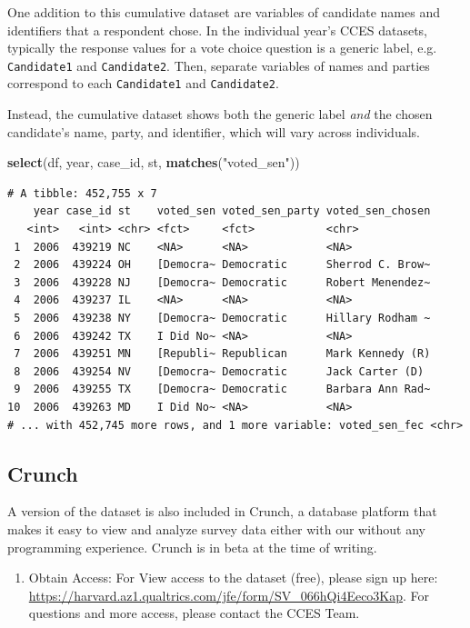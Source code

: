 \documentclass[10pt,article,oneside]{memoir}
\theoremstyle{definition}
\newenvironment{Shaded}{\begin{snugshade}}{\end{snugshade}}
\newcommand{\KeywordTok}[1]{\textcolor[rgb]{0.13,0.29,0.53}{\textbf{#1}}}
\newcommand{\NormalTok}[1]{#1}
\newcommand{\StringTok}[1]{\textcolor[rgb]{0.31,0.60,0.02}{#1}}
\begin{document}
One addition to this cumulative dataset are variables of candidate names
and identifiers that a respondent chose. In the individual year's CCES
datasets, typically the response values for a vote choice question is a
generic label, e.g. \texttt{Candidate1} and \texttt{Candidate2}. Then,
separate variables of names and parties correspond to each
\texttt{Candidate1} and \texttt{Candidate2}.

Instead, the cumulative dataset shows both the generic label \emph{and}
the chosen candidate's name, party, and identifier, which will vary
across individuals.

\begin{Shaded}
\begin{Highlighting}[]
\KeywordTok{select}\NormalTok{(df, year, case_id, st, }\KeywordTok{matches}\NormalTok{(}\StringTok{"voted_sen"}\NormalTok{))}
\end{Highlighting}
\end{Shaded}

\begin{verbatim}
# A tibble: 452,755 x 7
    year case_id st    voted_sen voted_sen_party voted_sen_chosen
   <int>   <int> <chr> <fct>     <fct>           <chr>           
 1  2006  439219 NC    <NA>      <NA>            <NA>            
 2  2006  439224 OH    [Democra~ Democratic      Sherrod C. Brow~
 3  2006  439228 NJ    [Democra~ Democratic      Robert Menendez~
 4  2006  439237 IL    <NA>      <NA>            <NA>            
 5  2006  439238 NY    [Democra~ Democratic      Hillary Rodham ~
 6  2006  439242 TX    I Did No~ <NA>            <NA>            
 7  2006  439251 MN    [Republi~ Republican      Mark Kennedy (R)
 8  2006  439254 NV    [Democra~ Democratic      Jack Carter (D) 
 9  2006  439255 TX    [Democra~ Democratic      Barbara Ann Rad~
10  2006  439263 MD    I Did No~ <NA>            <NA>            
# ... with 452,745 more rows, and 1 more variable: voted_sen_fec <chr>
\end{verbatim}

\hypertarget{crunch}{%
\subsection{Crunch}\label{crunch}}

A version of the dataset is also included in Crunch, a database platform
that makes it easy to view and analyze survey data either with our
without any programming experience. Crunch is in beta at the time of
writing.

\begin{enumerate}
\def\labelenumi{\arabic{enumi}.}
\tightlist
\item
  Obtain Access: For View access to the dataset (free), please sign up
  here:
  \url{https://harvard.az1.qualtrics.com/jfe/form/SV_066hQi4Eeco3Kap}.
  For questions and more access, please contact the CCES Team.
\end{enumerate}
\end{document}

